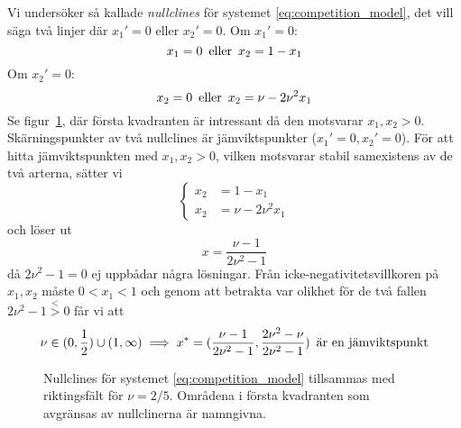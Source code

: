\documentclass{article}
\begin{document}
Vi undersöker så kallade \emph{nullclines} för systemet \eqref{eq:competition_model},
det vill säga två linjer där $x_1'=0$ eller $x_2'=0$.
Om $x_1' = 0$:
$$ x_1 = 0 \text{\, eller \,} x_2 = 1 - x_1 $$
Om $x_2' = 0$:
$$ x_2 = 0 \text{\, eller \,} x_2 = \nu - 2\nu^2 x_1 $$
Se figur~\ref{fig:nullclines},
där första kvadranten är intressant då den motsvarar $x_1, x_2 > 0$.
Skärningspunkter av två nullclines är jämviktspunkter ($x_1'=0, x_2'=0$).
För att hitta jämviktspunkten med $x_1, x_2 > 0$,
vilken motsvarar stabil samexistens av de två arterna,
sätter vi
$$ \left\{ \begin{aligned}
	x_2 &= 1 - x_1 \\
	x_2 &= \nu - 2\nu^2x_1
\end{aligned} \right. $$
och löser ut
$$ x = \frac{\nu - 1}{2\nu^2 - 1} $$
då $2\nu^2 - 1 = 0$ ej uppbådar några lösningar.
Från icke-negativitetsvillkoren på $x_1,x_2$ måste $0 < x_1 < 1$ och genom att
betrakta var olikhet för de två fallen $2\nu^2 - 1 \overset<> 0$ får vi att
$$ \nu \in (0, \frac12) \cup (1, \infty) \implies x^* = (\frac{\nu-1}{2\nu^2-1}, \frac{2\nu^2-\nu}{2\nu^2-1}) \text{\, är en jämviktspunkt} $$

\begin{figure}
	\centering
	\caption{Nullclines för systemet \eqref{eq:competition_model} tillsammas med riktingsfält för $\nu=2/5$. Områdena i första kvadranten som avgränsas av nullclinerna är namngivna. \label{fig:nullclines}}
\end{figure}
\end{document}
